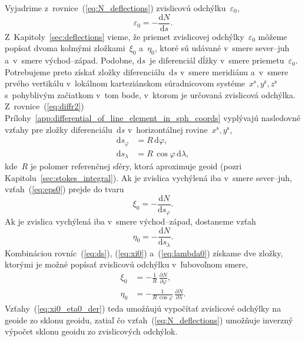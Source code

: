 \documentclass[a4paper, 12pt]{book}
\newcommand{\diff}{\mathrm d}
\begin{document}
Vyjadrime z~rovnice~(\ref{eq:N_deflections}) zvislicovú 
odchýlku~$\varepsilon_0$,
%
\begin{equation}
\label{eq:eps0}
\varepsilon_0 = -\frac{\diff N}{\diff s}{.}
\end{equation}
%
Z~Kapitoly~\ref{sec:deflections} vieme, že priemet zvislicovej 
odchýlky~$\varepsilon_0$ môžeme popísať dvoma kolmými zložkami~$\xi_0$ 
a~$\eta_0$, ktoré sú udávané v~smere sever--juh a~v~smere východ--západ.  
Podobne, $\diff s$~je diferenciál dĺžky v~smere priemetu~$\varepsilon_0$.  
Potrebujeme preto získať zložky diferenciálu~$\diff s$ v~smere meridiánu 
a~v~smere prvého vertikálu v~lokálnom karteziánskom súradnicovom 
systéme~$x^\mathrm{s}, y^\mathrm{s}, z^\mathrm{s}$ s~pohyblivým začiatkom v~tom 
bode, v~ktorom je určovaná zvislicová odchýlka.  Z~rovnice~(\ref{eq:diffr2}) 
Prílohy~\ref{app:differential_of_line_element_in_sph_coords} vyplývajú 
nasledovné vzťahy pre zložky diferenciálu~$\diff s$ v~horizontálnej 
rovine~$x^\mathrm{s}, y^\mathrm{s}$,
%
\begin{equation}
\label{eq:ds}
\begin{split}
\diff s_\varphi &= R \, \diff \varphi{,}\\
%
\diff s_\lambda &= R \, \cos\varphi \, \diff \lambda{,}
\end{split}
\end{equation}
%
kde~$R$ je polomer referenčnej sféry, ktorá aproximuje geoid (pozri 
Kapitolu~\ref{sec:stokes_integral}).  Ak je zvislica vychýlená iba v~smere 
sever--juh, vzťah~(\ref{eq:eps0}) prejde do tvaru
%
\begin{equation}
\label{eq:xi0}
\xi_0 = -\frac{\diff N}{\diff s_\varphi}{.}
\end{equation}
%
Ak je zvislica vychýlená iba v~smere východ--západ, dostaneme vzťah
%
\begin{equation}
\label{eq:lambda0}
\eta_0 = -\frac{\diff N}{\diff s_\lambda}{.}
\end{equation}
%
Kombináciou rovníc~(\ref{eq:ds}), (\ref{eq:xi0}) a~(\ref{eq:lambda0}) získame 
dve zložky, ktorými je možné popísať zvislicovú odchýlku v~ľubovoľnom smere,
%
\begin{equation}
\begin{split}
\label{eq:xi0_eta0_der}
\xi_0 &= -\frac{1}{R} \, \frac{\partial N}{\partial \varphi}{,}\\
%
\eta_0 &= -\frac{1}{R \, \cos\varphi} \, \frac{\partial N}{\partial \lambda}{.}
\end{split}
\end{equation}
%
Vzťahy~(\ref{eq:xi0_eta0_der}) teda umožňujú vypočítať zvislicové odchýlky na 
geoide zo sklonu geoidu, zatiaľ čo vzťah~(\ref{eq:N_deflections}) umožňuje 
inverzný výpočet sklonu geoidu zo zvislicových odchýlok.
\end{document}
